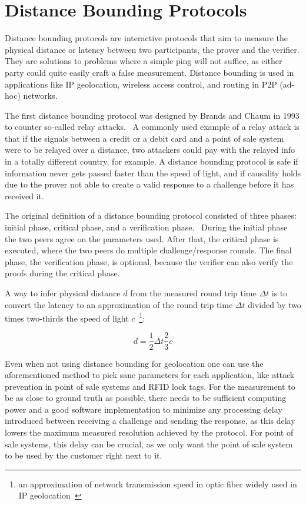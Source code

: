 \section{Distance Bounding Protocols}

Distance bounding protocols are interactive protocols that aim to measure the physical distance or latency between two participants, the prover and the verifier. They are solutions to problems where a simple ping will not suffice, as either party could quite easily craft a false measurement. Distance bounding is used in applications like IP geolocation, wireless access control, and routing in P2P (ad-hoc) networks.

The first distance bounding protocol was designed by Brands and Chaum in 1993 to counter so-called relay attacks.~\cite{Boureanu_undated-bn, Brands1994-hz} A commonly used example of a relay attack is that if the signals between a credit or a debit card and a point of sale system were to be relayed over a distance, two attackers could pay with the relayed info in a totally different country, for example. A distance bounding protocol is safe if information never gets passed faster than the speed of light, and if causality holds due to the prover not able to create a valid response to a challenge before it has received it.~\cite{Boureanu_undated-bn}

The original definition of a distance bounding protocol consisted of three phases: initial phase, critical phase, and a verification phase.~\cite{Brands1994-hz, Mauw2018-uz} During the initial phase the two peers agree on the parameters used. After that, the critical phase is executed, where the two peers do multiple challenge/response rounds. The final phase, the verification phase, is optional, because the verifier can also verify the proofs during the critical phase.

A way to infer physical distance \(d\) from the measured round trip time \(\Delta t\) is to convert the latency to an approximation of the round trip time \(\Delta t\) divided by two times two-thirds the speed of light \(c\)~\footnote{an approximation of network transmission speed in optic fiber widely used in IP geolocation~\cite{Candela2020-am}}:

\begin{equation*}
  d = \frac{1}{2}\Delta t \frac{2}{3}c
\end{equation*}

Even when not using distance bounding for geolocation one can use the aforementioned method to pick sane parameters for each application, like attack prevention in point of sale systems and RFID lock tags. For the measurement to be as close to ground truth as possible, there needs to be sufficient computing power and a good software implementation to minimize any processing delay introduced between receiving a challenge and sending the response, as this delay lowers the maximum measured resolution achieved by the protocol. For point of sale systems, this delay can be crucial, as we only want the point of sale system to be used by the customer right next to it.

